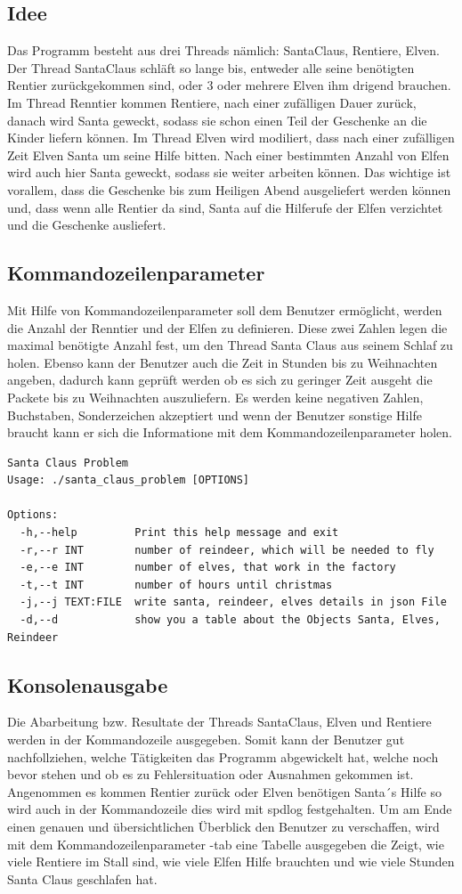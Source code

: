 \documentclass[a4paper,12pt]{article}
\begin{document}
\subsection{Idee}
Das Programm besteht aus drei Threads nämlich: SantaClaus, Rentiere, Elven. Der Thread SantaClaus schläft so lange bis, entweder alle seine benötigten Rentier zurückgekommen sind, oder 3 oder mehrere Elven ihm drigend brauchen.
Im Thread Renntier kommen Rentiere, nach einer zufälligen Dauer zurück, danach wird Santa geweckt, sodass sie schon einen Teil der Geschenke an die Kinder liefern können. Im Thread Elven wird modiliert, dass
nach einer zufälligen Zeit Elven Santa um seine Hilfe bitten. Nach einer bestimmten Anzahl von Elfen wird auch hier Santa geweckt, sodass sie weiter arbeiten können. Das wichtige ist vorallem, dass die Geschenke bis zum Heiligen Abend
ausgeliefert werden können und, dass wenn alle Rentier da sind, Santa auf die Hilferufe der Elfen verzichtet und die Geschenke ausliefert.

\subsection{Kommandozeilenparameter}
Mit Hilfe von Kommandozeilenparameter soll dem Benutzer ermöglicht, werden die Anzahl der Renntier und der Elfen zu definieren. Diese zwei Zahlen legen die maximal benötigte Anzahl fest, um den Thread Santa Claus aus seinem Schlaf zu holen.
Ebenso kann der Benutzer auch die Zeit in Stunden bis zu Weihnachten angeben, dadurch kann geprüft werden ob es sich zu geringer Zeit ausgeht die Packete bis zu Weihnachten auszuliefern.
Es werden keine negativen Zahlen, Buchstaben, Sonderzeichen akzeptiert und wenn der Benutzer sonstige Hilfe braucht kann er sich die Informatione mit dem Kommandozeilenparameter holen.
\begin{verbatim}
Santa Claus Problem
Usage: ./santa_claus_problem [OPTIONS]

Options:
  -h,--help         Print this help message and exit
  -r,--r INT        number of reindeer, which will be needed to fly
  -e,--e INT        number of elves, that work in the factory
  -t,--t INT        number of hours until christmas
  -j,--j TEXT:FILE  write santa, reindeer, elves details in json File
  -d,--d            show you a table about the Objects Santa, Elves, Reindeer
\end{verbatim}

\subsection{Konsolenausgabe}
Die Abarbeitung bzw. Resultate der Threads SantaClaus, Elven und Rentiere werden in der Kommandozeile ausgegeben. Somit kann der Benutzer gut nachfollziehen, welche Tätigkeiten das Programm abgewickelt hat, welche noch bevor stehen und
ob es zu Fehlersituation oder Ausnahmen gekommen ist. Angenommen es kommen Rentier zurück oder Elven benötigen Santa´s Hilfe so wird auch in der Kommandozeile dies wird mit spdlog festgehalten. Um am Ende einen genauen und übersichtlichen 
Überblick den Benutzer zu verschaffen, wird mit dem Kommandozeilenparameter -tab eine Tabelle ausgegeben die Zeigt, wie viele Rentiere im Stall sind, wie viele Elfen Hilfe brauchten und wie viele Stunden Santa Claus geschlafen hat.
\newpage
\end{document}

